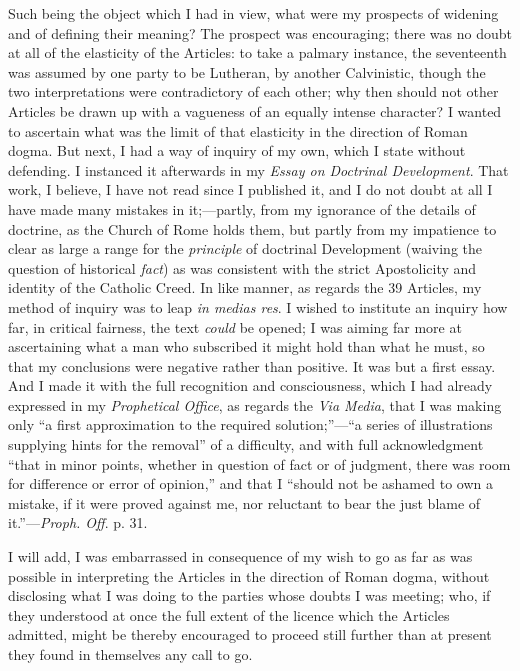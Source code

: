 Such being the object which I had in view, what were my prospects of
widening and of defining their meaning? The prospect was
encouraging; there was no doubt at all of the elasticity of the
Articles: to take a palmary instance, the seventeenth was assumed by one
party to be Lutheran, by another Calvinistic, though the two
interpretations were contradictory of each other; why then
should not other Articles be drawn up with a vagueness of an equally
intense character? I wanted to ascertain what was the limit of that
elasticity in the direction of Roman dogma. But next, I had a way of
inquiry of my own, which I state without defending. I instanced it
afterwards in my \emph{Essay on Doctrinal Development}. That work, I believe, I
have not read since I published it, and I do not doubt at all I have made many mistakes in it;—partly, from my ignorance of
the details of doctrine, as the Church of Rome holds them, but partly
from my impatience to clear as large a range for the \emph{principle} of
doctrinal Development (waiving the question of historical \emph{fact})
as was consistent with the strict Apostolicity and identity of the
Catholic Creed. In like manner, as regards the 39 Articles, my method of
inquiry was to leap \emph{in medias res}. I wished to institute an
inquiry how far, in critical fairness, the text \emph{could} be opened;
I was aiming far more at ascertaining what a man who subscribed it might
hold than what he must, so that my conclusions were negative rather than
positive. It was but a first essay. And I made it with the full
recognition and consciousness, which I had already expressed in my \emph{Prophetical Office}, as regards the \emph{Via Media}, that I was making
only ``a first approximation to the required solution;''—``a
series of illustrations supplying hints for the removal''
of a difficulty, and with full acknowledgment ``that in minor
points, whether in question of fact or of judgment, there was room for
difference or error of opinion,'' and that I ``should not be
ashamed to own a mistake, if it were proved against me, nor reluctant to
bear the just blame of it.''—\emph{Proph. Off}. p. 31.

I will add, I was embarrassed in consequence of my wish to
go as far as was possible in interpreting the Articles in the direction
of Roman dogma, without disclosing what I was doing to the parties whose
doubts I was meeting; who, if they understood at once the full
extent of the licence which the Articles admitted, might be
thereby encouraged to proceed still further than at present they
found in themselves any call to go.


